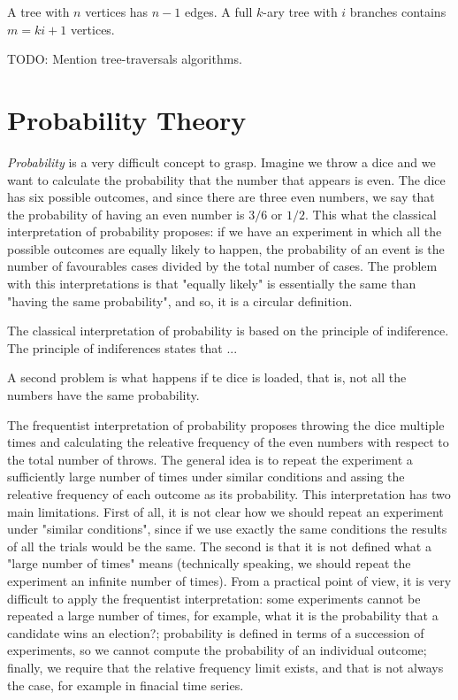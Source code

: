 \begin{example}
A tree with $n$ vertices has $n-1$ edges. A full $k$-ary tree with $i$ branches contains $m=ki+1$ vertices.
\end{example}

{\color{red} TODO: Mention tree-traversals algorithms.}

%
%

\section{Probability Theory}
\label{sec:probability}

\emph{Probability} is a very difficult concept to grasp. Imagine we throw a dice and we want to calculate the probability that the number that appears is even. The dice has six possible outcomes, and since there are three even numbers, we say that the probability of having an even number is $3/6$ or $1/2$. This what the classical interpretation of probability proposes: if we have an experiment in which all the possible outcomes are equally likely to happen, the probability of an event is the number of favourables cases divided by the total number of cases. The problem with this interpretations is that "equally likely" is essentially the same than "having the same probability", and so, it is a circular definition. 

The classical interpretation of probability is based on the principle of indiference. The principle of indiferences states that ...

A second problem is what happens if te dice is loaded, that is, not all the numbers have the same probability.

The frequentist interpretation of probability proposes throwing the dice multiple times and calculating the releative frequency of the even numbers with respect to the total number of throws. The general idea is to repeat the experiment a sufficiently large number of times under similar conditions and assing the releative frequency of each outcome as its probability. This interpretation has two main limitations. First of all, it is not clear how we should repeat an experiment under "similar conditions", since if we use exactly the same conditions the results of all the trials would be the same. The second is that it is not defined what a "large number of times" means (technically speaking, we should repeat the experiment an infinite number of times). From a practical point of view, it is very difficult to apply the frequentist interpretation: some experiments cannot be repeated a large number of times, for example, what it is the probability that a candidate wins an election?; probability is defined in terms of a succession of experiments, so we cannot compute the probability of an individual outcome; finally, we require that the relative frequency limit exists, and that is not always the case, for example in finacial time series.

